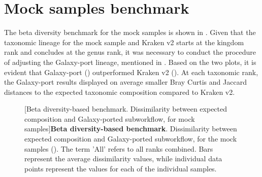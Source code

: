 \section{Mock samples benchmark}\label{sec:Mock samples}
The beta diversity benchmark for the mock samples is shown in . Given that the taxonomic lineage for the mock sample and Kraken v2 starts at the kingdom rank and concludes at the genus rank, it was necessary to conduct the procedure of adjusting the Galaxy-port lineage, mentioned in . Based on the two plots, it is evident that Galaxy-port () outperformed Kraken v2 (). At each taxonomic rank, the Galaxy-port results displayed on average smaller Bray Curtis and Jaccard distances to the expected taxonomic composition compared to Kraken v2.\par

\begin{figure}[H]
  \centering
  \hfill
  [Beta diversity-based benchmark. Dissimilarity between expected composition and Galaxy-ported subworkflow, for mock samples]{\textbf{Beta diversity-based benchmark}. Dissimilarity between expected composition and Galaxy-ported subworkflow, for the mock samples (). The term 'All' refers to all ranks combined. Bars represent the average dissimilarity values, while individual data points represent the values for each of the individual samples.} \label{fig:mock_human_gut_beta_div_galaxy}%
\end{figure}

